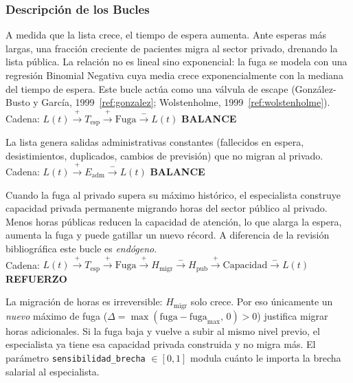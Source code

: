 \documentclass[12pt,a4paper]{article}
\begin{document}
\subsubsection*{Descripción de los Bucles}

\begin{description}[leftmargin=1cm,style=nextline]
  \item[\textcolor{verdeDS}{\textbf{B1 — Balance: Fuga al Sector Privado}}]
        A medida que la lista crece, el tiempo de espera aumenta. Ante esperas más largas, una fracción creciente de pacientes migra al sector privado, drenando la lista pública. La relación no es lineal sino exponencial: la fuga se modela con una regresión Binomial Negativa cuya media crece exponencialmente con la mediana del tiempo de espera. Este bucle actúa como una válvula de escape (González-Busto y García, 1999~\ref{ref:gonzalez}; Wolstenholme, 1999~\ref{ref:wolstenholme}).\\
        Cadena: $L(t) \overset{+}{\to} T_{\text{esp}} \overset{+}{\to} \text{Fuga} \overset{-}{\to} L(t)$ \quad\textbf{BALANCE}

  \item[\textcolor{verdeDS}{\textbf{B2 — Balance: Drenaje Administrativo}}]
        La lista genera salidas administrativas constantes (fallecidos en espera, desistimientos, duplicados, cambios de previsión) que no migran al privado.\\
        Cadena: $L(t) \overset{+}{\to} E_{\text{adm}} \overset{-}{\to} L(t)$ \quad\textbf{BALANCE}

  \item[\textcolor{rojoDS}{\textbf{R1 — Refuerzo: Espiral de Erosión de Capacidad (Deadly Spiral)}}]
        Cuando la fuga al privado supera su máximo histórico, el especialista construye capacidad privada permanente migrando horas del sector público al privado. Menos horas públicas reducen la capacidad de atención, lo que alarga la espera, aumenta la fuga y puede gatillar un nuevo récord. A diferencia de la revisión bibliográfica este bucle es \emph{endógeno}.\\
        Cadena: $L(t) \overset{+}{\to} T_{\text{esp}} \overset{+}{\to} \text{Fuga} \overset{+}{\to} H_{\text{migr}} \overset{-}{\to} H_{\text{pub}} \overset{+}{\to} \text{Capacidad} \overset{-}{\to} L(t)$ \quad\textbf{REFUERZO}
\end{description}

\begin{tcolorbox}[colback=rojoDS!5,colframe=rojoDS!60,fonttitle=\bfseries,
    title=Lógica de récord del bucle R1]
  La migración de horas es irreversible: $H_{\text{migr}}$ solo crece. Por eso únicamente un \emph{nuevo} máximo de fuga ($\Delta = \max(\text{fuga} - \text{fuga}_{\max},\,0) > 0$) justifica migrar horas adicionales. Si la fuga baja y vuelve a subir al mismo nivel previo, el especialista ya tiene esa capacidad privada construida y no migra más. El parámetro \texttt{sensibilidad\_brecha} $\in[0,1]$ modula cuánto le importa la brecha salarial al especialista.
\end{tcolorbox}
\end{document}
